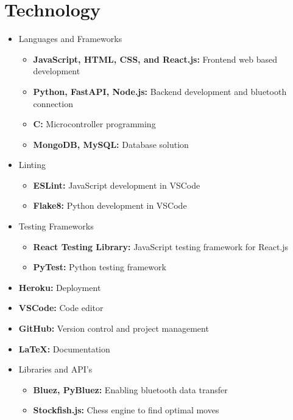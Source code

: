 \documentclass{article}
\begin{document}
\section{Technology}

\begin{itemize}
\item Languages and Frameworks
\begin{itemize}
    \item \textbf{JavaScript, HTML, CSS, and React.js:} Frontend web based development
    \item \textbf{Python, FastAPI, Node.js:} Backend development and bluetooth connection
    \item \textbf{C:} Microcontroller programming
    \item \textbf{MongoDB, MySQL:} Database solution
\end{itemize}

\item Linting
\begin{itemize}
    \item \textbf{ESLint:} JavaScript development in VSCode
    \item \textbf{Flake8:} Python development in VSCode
\end{itemize} 

\item Testing Frameworks
\begin{itemize}
    \item \textbf{React Testing Library:} JavaScript testing framework for React.js
    \item \textbf{PyTest:} Python testing framework
\end{itemize}

\item \textbf{Heroku:} Deployment

\item \textbf{VSCode:} Code editor

\item \textbf{GitHub:} Version control and project management

\item \textbf{LaTeX:} Documentation

\item Libraries and API's
\begin{itemize}
    \item \textbf{Bluez, PyBluez:} Enabling bluetooth data transfer
    \item \textbf{Stockfish.js:} Chess engine to find optimal moves
\end{itemize}


\end{itemize}
\end{document}
